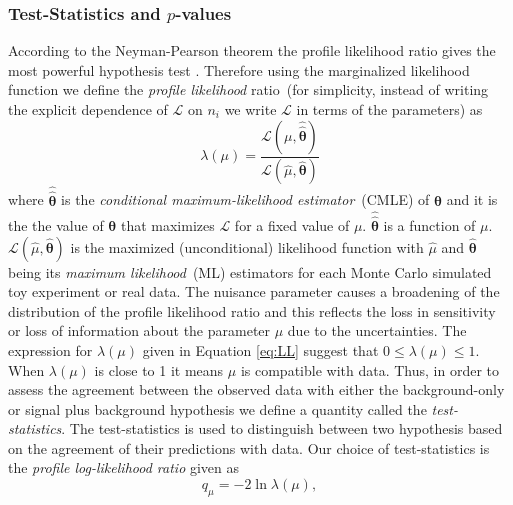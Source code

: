 \subsubsection{Test-Statistics and $p$-values} 
According to the Neyman-Pearson theorem the profile likelihood ratio gives the most powerful hypothesis test \cite{NPT}. Therefore using the marginalized likelihood function we define the \textit{profile likelihood} ratio~(for simplicity, instead of writing the explicit dependence of $\mathcal{L}$ on $n_{i}$ we write  $\mathcal{L}$ in terms of the parameters) as
\begin{equation}\label{eq:PLL}
\lambda(\mu) =  \frac{\mathcal{L}(\mu, \hat{\hat{\mathbf{\theta}}})}{\mathcal{L}(\hat{\mu}, \hat{\mathbf{\theta}} )}
\end{equation}
where $\hat{\hat{\mathbf{\theta}}}$ is the \textit{conditional maximum-likelihood estimator}~(CMLE) of $\mathbf{\theta}$ and it is the the value of $\mathbf{\theta}$ that maximizes $\mathcal{L}$ for a fixed value of $\mu$. $\hat{\hat{\mathbf{\theta}}}$ is a function of $\mu$.  $\mathcal{L}(\hat{\mu}, \hat{\mathbf{\theta}} )$ is the maximized (unconditional) likelihood function with $\hat{\mu}$ and $\hat{\mathbf{\theta}}$ being its \textit{maximum likelihood}~(ML) estimators for each Monte Carlo simulated toy experiment or real data. 
\newline
The nuisance parameter causes a broadening of the distribution of the profile likelihood ratio and this reflects the loss in sensitivity or loss of information about the parameter $\mu$ due to the uncertainties.%
\newline
The expression for $\lambda(\mu)$ given in Equation \ref{eq:LL} suggest that $0 \leq \lambda(\mu) \leq 1$. When $\lambda(\mu)$ is close to 1 it means $\mu$ is compatible with data. Thus, in order to assess the agreement between the observed data with either the background-only or signal plus background hypothesis we define a quantity called the \textit{test-statistics}. The test-statistics is used to distinguish between two hypothesis based on the agreement of their predictions with data. Our choice of test-statistics is the \textit{profile log-likelihood ratio} given as
\begin{equation}
 q_{\mu} = -2\ln \lambda(\mu),
\end{equation}
